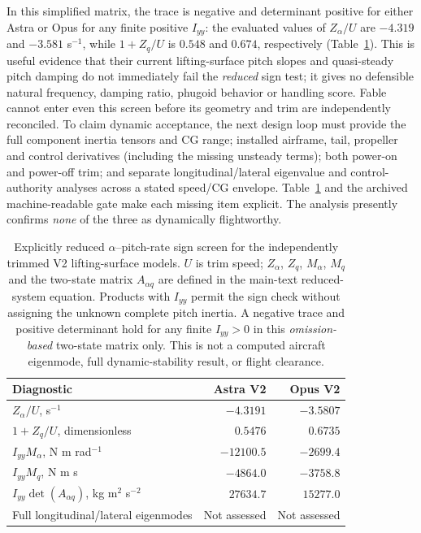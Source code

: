 \documentclass[11pt,a4paper]{article}
\begin{document}
In this simplified matrix, the trace is negative and determinant positive for either Astra or Opus for any finite positive $I_{yy}$: the evaluated values of $Z_\alpha/U$ are $-4.319$ and $-3.581$ s$^{-1}$, while $1+Z_q/U$ is $0.548$ and $0.674$, respectively (Table~\ref{tab:reduceddynamic}). This is useful evidence that their current lifting-surface pitch slopes and quasi-steady pitch damping do not immediately fail the \emph{reduced} sign test; it gives no defensible natural frequency, damping ratio, phugoid behavior or handling score. Fable cannot enter even this screen before its geometry and trim are independently reconciled. To claim dynamic acceptance, the next design loop must provide the full component inertia tensors and CG range; installed airframe, tail, propeller and control derivatives (including the missing unsteady terms); both power-on and power-off trim; and separate longitudinal/lateral eigenvalue and control-authority analyses across a stated speed/CG envelope. Table~\ref{tab:reduceddynamic} and the archived machine-readable gate make each missing item explicit. The analysis presently confirms \emph{none} of the three as dynamically flightworthy.

\begin{table}[H]\centering\footnotesize
\caption{Explicitly reduced $\alpha$--pitch-rate sign screen for the independently trimmed V2 lifting-surface models. $U$ is trim speed; $Z_\alpha$, $Z_q$, $M_\alpha$, $M_q$ and the two-state matrix $A_{\alpha q}$ are defined in the main-text reduced-system equation. Products with $I_{yy}$ permit the sign check without assigning the unknown complete pitch inertia. A negative trace and positive determinant hold for any finite $I_{yy}>0$ in this \emph{omission-based} two-state matrix only. This is not a computed aircraft eigenmode, full dynamic-stability result, or flight clearance.}\label{tab:reduceddynamic}
\begin{tabular}{lrr}\toprule
Diagnostic & Astra V2 & Opus V2\\\midrule
$Z_\alpha/U$, s$^{-1}$ & $-4.3191$ & $-3.5807$\\
$1+Z_q/U$, dimensionless & $0.5476$ & $0.6735$\\
$I_{yy}M_\alpha$, N m rad$^{-1}$ & $-12100.5$ & $-2699.4$\\
$I_{yy}M_q$, N m s & $-4864.0$ & $-3758.8$\\
$I_{yy}\det(A_{\alpha q})$, kg m$^2$ s$^{-2}$ & $27634.7$ & $15277.0$\\
Full longitudinal/lateral eigenmodes & Not assessed & Not assessed\\\bottomrule
\end{tabular}
\end{table}
\end{document}
